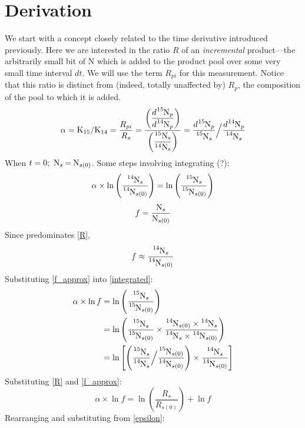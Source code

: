 \section{Derivation}
We start with a concept closely related to the time derivative introduced previously. Here we are interested in the ratio $R$ of an \emph{incremental} product---the arbitrarily small bit of N which is added to the product pool over some very small time interval $dt$. We will use the term $R_{pi}$ for this measurement. Notice that this ratio is distinct from (indeed, totally unaffected by) $R_p$, the composition of the pool to which it is added.
\begin{equation}
    \alpha=\ce{K_{15}/K_{14}}=\dfrac{R_{pi}}{R_s}=\frac{\left(\dfrac{d\ce{^{15}N_p}}{d\ce{^{14}N_p}}\right)}{\left(\ce{\dfrac{^{15}N_s}{^{14}N_s}}\right)}=\frac{d\ce{^{15}N_p}}{\ce{^{15}N_s}}\Big/\frac{d\ce{^{14}N_p}}{\ce{^{14}N_s}}\label{alpha/R}
\end{equation}
When $t=0;\ \ce{N_s = N_{s(0)}}$. Some steps involving integrating (?):
\begin{equation}
    \alpha \times \ln{\left(\frac{\ce{^{14}N_s}}{\ce{^{14}N_{s(0)}}}\right)}=\ln{\left(\frac{\ce{^{15}N_s}}{\ce{^{15}N_{s(0)}}}\right)}\label{integrated}
\end{equation}
\begin{equation}
    f = \ce{\frac{N_s}{N_{s(0)}}}\label{f}
\end{equation}
Since  predominates \eqref{R},
\begin{equation}
    f \approx \ce{\frac{^{14}N_s}{^{14}N_{s(0)}}}\label{f_approx}
\end{equation}
Substituting \eqref{f_approx} into \eqref{integrated}:
\begin{align*}
    \alpha \times \ln{f} &=\ln{\left(\frac{\ce{^{15}N_s}}{\ce{^{15}N_{s(0)}}}\right)}\\
    &=\ln{\left(\frac{\ce{^{15}N_s}}{\ce{^{15}N_{s(0)}}}\times\frac{\ce{^{14}N_{s(0)}\times^{14}N_s}}{\ce{^{14}N_s\times^{14}N_{s(0)}}}\right)}\\
    &=\ln{\left[\left(\ce{\frac{^{15}N_s}{^{14}N_s}}\Big/\ce{\frac{^{15}N_{s(0)}}{^{14}N_{s(0)}}}\right)\times\ce{\frac{^{14}N_s}{^{14}N_{s(0)}}}\right]}
\end{align*}
Substituting \eqref{R} and \eqref{f_approx}:
\begin{equation}
    \alpha \times \ln{f} = \ln{\left(\frac{R_s}{R_{s(0)}}\right)}+\ln{f}
\end{equation}
Rearranging and substituting from \eqref{epsilon}:
